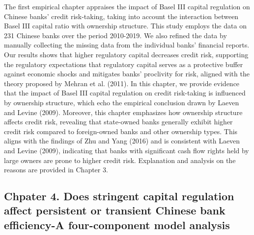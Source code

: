 \documentclass[
  letterpaper,
  DIV=11,
  numbers=noendperiod]{scrreprt}
\begin{document}
The first empirical chapter appraises the impact of Basel III capital
regulation on Chinese banks' credit risk-taking, taking into account the
interaction between Basel III capital ratio with ownership structure.
This study employs the data on 231 Chinese banks over the period
2010-2019. We also refined the data by manually collecting the missing
data from the individual banks' financial reports. Our results shows
that higher regulatory capital decreases credit risk, supporting the
regulatory expectations that regulatory capital serves as a protective
buffer against economic shocks and mitigates banks' proclivity for risk,
aligned with the theory proposed by Mehran et al. (2011). In this
chapter, we provide evidence that the impact of Basel III capital
regulation on credit risk-taking is influenced by ownership structure,
which echo the empirical conclusion drawn by Laeven and Levine (2009).
Moreover, this chapter emphasizes how ownership structure affects credit
risk, revealing that state-owned banks generally exhibit higher credit
risk compared to foreign-owned banks and other ownership types. This
aligns with the findings of Zhu and Yang (2016) and is consistent with
Laeven and Levine (2009), indicating that banks with significant cash
flow rights held by large owners are prone to higher credit risk.
Explanation and analysis on the reasons are provided in Chapter 3.

\subsection{Chpater 4. Does stringent capital regulation affect
persistent or transient Chinese bank efficiency-A four-component model
analysis}\label{chpater-4.-does-stringent-capital-regulation-affect-persistent-or-transient-chinese-bank-efficiency-a-four-component-model-analysis}
\end{document}
